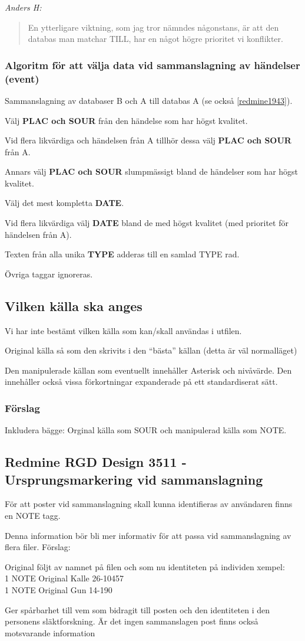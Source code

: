 \documentclass[swedish,11pt]{article}
\begin{document}
{\it Anders H:}
\begin{quotation}
En ytterligare viktning, som jag tror nämndes någonstans, är att den databas man matchar TILL, har en något högre prioritet vi konflikter.
\end{quotation}

\subsubsection{Algoritm för att välja data vid sammanslagning av händelser (event)}
Sammanslagning av databaser B och A till databas A (se också \ref{redmine1943}).
\label{algoritm}

Välj {\bf PLAC och SOUR} från den händelse som har högst kvalitet.

Vid flera likvärdiga och händelsen från A tillhör dessa välj {\bf PLAC och SOUR} från A.

Annars välj {\bf PLAC och SOUR} slumpmässigt bland de händelser som har högst kvalitet.

Välj det mest kompletta {\bf DATE}.

Vid flera likvärdiga välj {\bf DATE} bland de med högst kvalitet (med prioritet för händelsen från A).

Texten från alla unika {\bf TYPE} adderas till en samlad TYPE rad.

Övriga taggar ignoreras.

\subsection{Vilken källa ska anges}
Vi har inte bestämt vilken källa som kan/skall användas i utfilen.
 
Original källa så som den skrivits i den “bästa” källan (detta är väl normalläget)
 
Den manipulerade källan som eventuellt innehåller Asterisk och nivåvärde.
Den innehåller också vissa förkortningar expanderade på ett standardiserat sätt.

\subsubsection{Förslag}
Inkludera bägge: Orginal källa som SOUR och manipulerad källa som NOTE.

\subsection{Redmine RGD Design 3511 -Ursprungsmarkering vid sammanslagning}


För att poster vid sammanslagning skall kunna identifieras av användaren finns en NOTE tagg.

Denna information bör bli mer informativ för att passa vid sammanslagning av flera filer.
Förslag:

Original följt av namnet på filen och som nu identiteten på individen
xempel:\\
1 NOTE Original Kalle 26-10457\\
1 NOTE Original Gun 14-190

Ger spårbarhet till vem som bidragit till posten och den identiteten i den personens släktforskning.
Är det ingen sammanslagen post finns också motsvarande information
\end{document}

